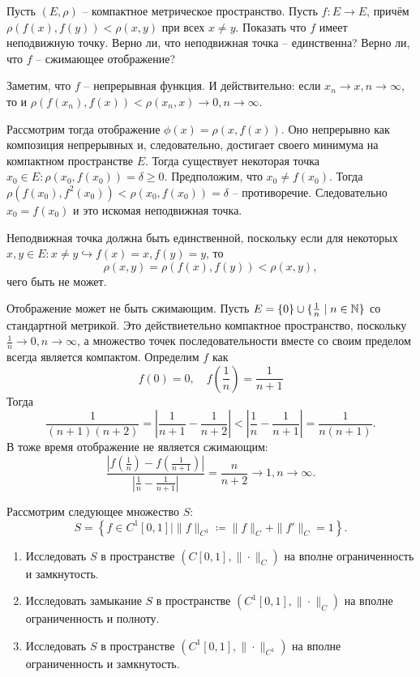 \begin{task}[\S 3.12]
    Пусть $(E, \rho)$ -- компактное метрическое пространство. Пусть $f\colon E \to E$, причём $\rho(f(x), f(y)) < \rho(x, y)$ при всех $x \neq y$. Показать что $f$ имеет неподвижную точку. Верно ли, что неподвижная точка -- единственна? Верно ли, что $f$ -- сжимающее отображение?
\end{task}
\begin{solve}
    Заметим, что $f$ -- непрерывная функция. И действительно: если $x_n \rightarrow x, n \rightarrow \infty$, то и $\rho(f(x_n), f(x)) < \rho(x_n, x) \rightarrow 0, n \rightarrow \infty$.

    Рассмотрим тогда отображение $\phi(x) = \rho(x, f(x))$. Оно непрерывно как композиция непрерывных и, следовательно, достигает своего минимума на компактном пространстве $E$. Тогда существует некоторая точка $x_0 \in E\colon \rho(x_0, f(x_0)) = \delta \geq 0$. Предположим, что $x_0 \neq f(x_0)$. Тогда $\rho(f(x_0), f^2(x_0)) < \rho(x_0, f(x_0)) = \delta$ -- противоречие. Следовательно $x_0 = f(x_0)$ и это искомая неподвижная точка.

    Неподвижная точка должна быть единственной, поскольку если для некоторых $x, y \in E\colon x \neq y \hookrightarrow f(x) = x, f(y) = y$, то
    \[
        \rho(x, y) = \rho(f(x), f(y)) < \rho(x, y),
    \]
    чего быть не может.

    Отображение может не быть сжимающим. Пусть $E = \{0\} \cup \{\frac{1}{n} \mid n \in \mathbb{N}\}$ со стандартной метрикой. Это действиетельно компактное пространство, поскольку $\frac{1}{n} \rightarrow 0, n \rightarrow \infty$, а множество точек последовательности вместе со своим пределом всегда является компактом. Определим $f$ как
    \[
        f(0) = 0, \quad f\left(\frac{1}{n}\right) = \frac{1}{n + 1}
    \]
    Тогда
    \[
        \frac{1}{(n + 1)(n + 2)} = \left|\frac{1}{n + 1} - \frac{1}{n + 2}\right| < \left|\frac{1}{n} - \frac{1}{n + 1}\right| = \frac{1}{n(n + 1)}.
    \]
    В тоже время отображение не является сжимающим:
    \[
        \frac{\left|f(\frac{1}{n}) - f(\frac{1}{n + 1})\right|}{\left|\frac{1}{n} - \frac{1}{n  +1}\right|} = \frac{n}{n + 2} \rightarrow 1, n \rightarrow \infty.
    \]
\end{solve}
\begin{task}[T10]
    Рассмотрим следующее множество $S\colon$
    \[
        S = \left\{f \in C^1[0, 1] \mid \|f\|_{C^1} \coloneq \|f\|_C + \|f'\|_C = 1 \right\}.
    \]
    \begin{enumerate}
        \item Исследовать $S$ в пространстве $(C[0, 1], \|\cdot\|_C)$  на вполне ограниченность и замкнутость.
        \item Исследовать замыкание $S$ в пространстве $(C^1[0, 1], \|\cdot\|_C)$ на вполне ограниченность и полноту.
        \item Исследовать $S$ в пространстве $(C^1[0, 1], \|\cdot\|_{C^1})$ на вполне ограниченность и замкнутость.
    \end{enumerate}
\end{task}
